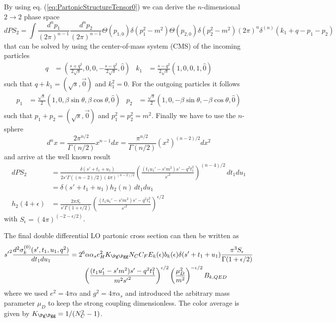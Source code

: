 By using eq. (\ref{eq:PartonicStructureTensor0}) we can derive the $n$-dimensional $2\rightarrow 2$ phase space
\begin{equation}
dPS_2 = \!\int\!\!\frac{d^{n}p_1}{(2\pi)^{n-1}}\frac{d^{n}p_2}{(2\pi)^{n-1}}\Theta(p_{1,0})\delta(p_1^2-m^2)\Theta(p_{2,0})\delta(p_2^2-m^2)(2\pi)^n\delta^{(n)}(k_1+q-p_1-p_2)
\end{equation}
that can be solved by using the center-of-mass system (CMS) of the incoming particles\cite{Bojak:2000eu}
\begin{align}
q &= \left(\frac {s+q^2}{2\sqrt s},0,0,-\frac{s-q^2}{2\sqrt s},\hat 0\right) &
k_1 &= \frac {s-q^2}{2\sqrt s}\left(1,0,0,1,\hat 0\right)
\end{align}
such that $q+k_1=(\sqrt s,\vec 0)$ and $k_1^2 = 0$. For the outgoing particles it follows
\begin{align}
p_1 &= \frac{\sqrt s} 2 \left(1,0,\beta\sin\theta,\beta\cos\theta,\hat 0\right)&
p_2 &= \frac{\sqrt s} 2 \left(1,0,-\beta\sin\theta,-\beta\cos\theta,\hat 0\right)
\end{align}
such that $p_1+p_2 = (\sqrt s,\vec 0)$ and $p_1^2 = p_2^2=m^2$. Finally we have to use the $n$-sphere
\begin{equation}
d^nx = \frac{2\pi^{n/2}}{\Gamma(n/2)}x^{n-1} dx= \frac{\pi^{n/2}}{\Gamma(n/2)}(x^2)^{(n-2)/2} dx^2
\end{equation}
and arrive at the well known result\cite{Laenen1993162}
\begin{align}
dPS_2 &= \frac {\delta(s'+t_1+u_1)} {2s'\Gamma((n-2)/2)(4\pi)^{(n-2)/2}}\left(\frac{(t_1u_1'-s'm^2)s' - q^2t_1^2}{s'^2}\right)^{(n-4)/2}\,dt_1du_1\\
 &= \delta(s'+t_1+u_1) h_2(n)\,dt_1 du_1\\
h_2(4+\epsilon) &= \frac {2\pi S_\epsilon} {s'\Gamma(1+\epsilon/2)}\left(\frac{(t_1u_1'-s'm^2)s' - q^2t_1^2}{s'^2}\right)^{\epsilon/2}
\end{align}
with $S_\epsilon = (4\pi)^{(-2-\epsilon/2)}$.

The final double differential LO partonic cross section can then be written as
\begin{align}
{s'}^2\frac{d^2\sigma_{k}^{(0)}(s',t_1,u_1,q^2)}{dt_1du_1} &= 2^6\alpha\alpha_s e_H^2 K_{\Pg\Pgg}N_CC_F E_k(\epsilon) b_k(\epsilon)\delta(s'+t_1+u_1) \frac{\pi^3S_\epsilon}{\Gamma(1+\epsilon/2)}  \nonumber\\
 &\hspace{20pt} \left(\frac{(t_1u_1'-s'm^2)s' - q^2t_1^2}{m^2{s'}^2}\right)^{\epsilon/2}\left(\frac{\mu_D^2}{m^2}\right)^{-\epsilon/2} B_{k,QED}
\end{align}
where we used $e^2=4\pi\alpha$ and $g^2=4\pi\alpha_s$ and introduced the arbitrary mass parameter $\mu_D$ to keep the strong coupling dimensionless. The color average is given by $K_{\Pg\Pgg} = 1/(N_C^2-1)$.

